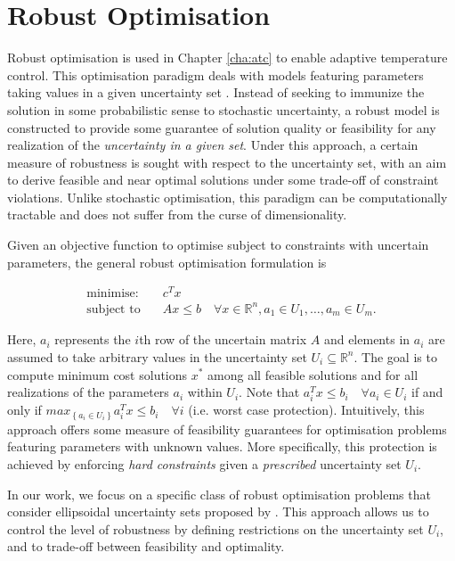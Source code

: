 \section{Robust Optimisation} \label{sec:atc:robust_opt:concept}

Robust optimisation is used in Chapter \ref{cha:atc} to enable adaptive temperature control. 
This optimisation paradigm deals with models featuring parameters taking values in a given uncertainty set \citep{bertsimas2011theory}. 
Instead of seeking to immunize the solution in some probabilistic sense to stochastic uncertainty, a robust model is constructed to provide some guarantee of solution quality or feasibility for any realization of the \textsl{uncertainty in a given set}. Under this approach, a certain measure of robustness is sought with respect to the uncertainty set, with an aim to derive feasible and near optimal solutions under some trade-off of constraint violations. Unlike stochastic optimisation, this paradigm can be computationally tractable and does not suffer from the curse of dimensionality. 

Given an objective function to optimise subject to constraints with uncertain parameters, the general robust optimisation formulation \citep{bertsimas2011theory} is 

\begingroup
\begin{align*}
\mbox{minimise:} \quad &c^Tx	\\
\mbox{subject to} \quad &Ax \leq b \quad \forall x \in \mathbb{R}^n, a_1 \in U_1, \ldots, a_m \in U_m.
\end{align*}
\endgroup

\noindent Here, $a_i$ represents the $i$th row of the uncertain matrix $A$ and elements in $a_i$ are assumed to take arbitrary values in the uncertainty set $U_i \subseteq \mathbb{R}^n$. The goal is to compute minimum cost solutions $x^\ast$ among all feasible solutions and for all realizations of the parameters $a_i$ within $U_i$. Note that $a^T_i x \leq b_i \quad \forall a_i \in U_i$ if and only if $max_{\left\{a_i \in U_i\right\}} a_i^Tx \leq b_i \quad \forall i$ (i.e. worst case protection). Intuitively, this approach offers some measure of feasibility guarantees for optimisation problems featuring parameters with unknown values. More specifically, this protection is achieved by enforcing \textsl{hard constraints} given a \textsl{prescribed} uncertainty set $U_i$. 

In our work, we focus on a specific class of robust optimisation problems that consider ellipsoidal uncertainty sets proposed by \cite{BenT99,ben2000robust}. This approach allows us to control the level of robustness by defining restrictions on the uncertainty set $U_i$, and to trade-off between feasibility and optimality. %


